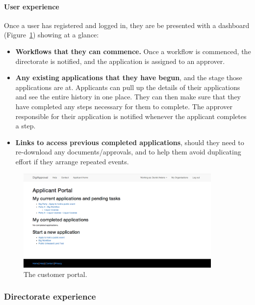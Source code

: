 \documentclass[12pt,a4paper,twosided]{article}
\begin{document}
\paragraph{User experience}

Once a user has registered and logged in, they are be presented with a
dashboard (Figure~\ref{fig:customer-portal}) showing at a glance:

\begin{itemize}

\item
  \textbf{Workflows that they can commence.} Once a workflow is
  commenced, the directorate is notified, and the application is
  assigned to an approver.
\item
  \textbf{Any existing applications that they have begun}, and the stage
  those applications are at. Applicants can pull up the details of their
  applications and see the entire history in one place. They can then
  make sure that they have completed any steps necessary for them to
  complete. The approver responsible for their application is notified
  whenever the applicant completes a step.
\item
  \textbf{Links to access previous completed applications}, should they
  need to re-download any documents/approvals, and to help them avoid
  duplicating effort if they arrange repeated events.
\end{itemize}

\begin{figure}[H]
  \centering
  \includegraphics[width=0.9\textwidth]{customer-portal.png}
  \caption{The customer portal.}
  \label{fig:customer-portal}
\end{figure}

\subsubsection{Directorate experience}
\end{document}
